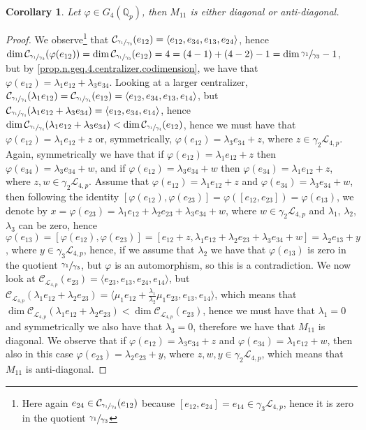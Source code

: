 \documentclass[12pt]{article}
\newtheorem{corollary}[theorem]{Corollary}
\begin{document}
\begin{corollary}
Let $\varphi\in G_4(\mathbb{Q}_p)$, then $M_{11}$ is either diagonal or anti-diagonal.
\end{corollary}
\begin{proof}
We observe\footnote{Here again $e_{24}\in\mathcal{C}_{\sfrac{\gamma_1}{\gamma_3}}(e_{12})$ because $[e_{12},e_{24}]=e_{14}\in\gamma_3\mathcal{L}_{4,p}$, hence it is zero in the quotient $\sfrac{\gamma_1}{\gamma_3}$} that $\mathcal{C}_{\sfrac{\gamma_1}{\gamma_3}}(e_{12})=\langle e_{12},e_{34},e_{13},e_{24}\rangle$, hence $\dim\mathcal{C}_{\sfrac{\gamma_1}{\gamma_3}}(\varphi(e_{12}))=\dim\mathcal{C}_{\sfrac{\gamma_1}{\gamma_3}}(e_{12})=4=(4-1)+(4-2)-1=\dim\sfrac{\gamma_1}{\gamma_3}-1$, but by \ref{prop.n.geq.4.centralizer.codimension}, we have that $\varphi(e_{12})=\lambda_1 e_{12}+\lambda_3 e_{34}$. Looking at a larger centralizer, $\mathcal{C}_{\sfrac{\gamma_1}{\gamma_4}}(\lambda_1 e_{12})=\mathcal{C}_{\sfrac{\gamma_1}{\gamma_4}}(e_{12})=\langle e_{12},e_{34},e_{13},e_{14}\rangle$, but $\mathcal{C}_{\sfrac{\gamma_1}{\gamma_4}}(\lambda_1 e_{12}+\lambda_3 e_{34})=\langle e_{12},e_{34},e_{14}\rangle$, hence $\dim\mathcal{C}_{\sfrac{\gamma_1}{\gamma_4}}(\lambda_1 e_{12}+\lambda_3 e_{34})<\dim\mathcal{C}_{\sfrac{\gamma_1}{\gamma_4}}(e_{12})$, hence we must have that $\varphi(e_{12})=\lambda_1 e_{12}+z$ or, symmetrically, $\varphi(e_{12})=\lambda_3 e_{34}+z$, where $z\in\gamma_2\mathcal{L}_{4,p}$. Again, symmetrically we have that if $\varphi(e_{12})=\lambda_1 e_{12}+z$ then $\varphi(e_{34})=\lambda_3 e_{34}+w$, and if $\varphi(e_{12})=\lambda_3 e_{34}+w$ then $\varphi(e_{34})=\lambda_1 e_{12}+z$, where $z,w\in\gamma_2\mathcal{L}_{4,p}$. Assume that $\varphi(e_{12})=\lambda_1 e_{12}+z$ and $\varphi(e_{34})=\lambda_3 e_{34}+w$, then following the identity $[\varphi(e_{12}),\varphi(e_{23})]=\varphi([e_{12},e_{23}])=\varphi(e_{13})$, we denote by $x=\varphi(e_{23})=\lambda_1 e_{12}+\lambda_2 e_{23}+\lambda_3 e_{34}+w$, where $w\in\gamma_2\mathcal{L}_{4,p}$ and $\lambda_1$, $\lambda_2$, $\lambda_3$ can be zero, hence $\varphi(e_{13})=[\varphi(e_{12}),\varphi(e_{23})]=[e_{12}+z,\lambda_1 e_{12}+\lambda_2 e_{23}+\lambda_3 e_{34}+w]=\lambda_2 e_{13}+y$, where $y\in\gamma_3\mathcal{L}_{4,p}$, hence, if we assume that $\lambda_2$ we have that $\varphi(e_{13})$ is zero in the quotient $\sfrac{\gamma_1}{\gamma_3}$, but $\varphi$ is an automorphism, so this is a contradiction. We now look at $\mathcal{C}_{\mathcal{L}_{4,p}}(e_{23})=\langle e_{23},e_{13},e_{24},e_{14}\rangle$, but $\mathcal{C}_{\mathcal{L}_{4,p}}(\lambda_1 e_{12}+\lambda_2 e_{23})=\langle \mu_1 e_{12}+\frac{\lambda_1}{\lambda_2}\mu_1 e_{23},e_{13},e_{14}\rangle$, which means that $\dim\mathcal{C}_{\mathcal{L}_{4,p}}(\lambda_1 e_{12}+\lambda_2 e_{23})<\dim\mathcal{C}_{\mathcal{L}_{4,p}}(e_{23})$, hence we must have that $\lambda_1=0$ and symmetrically we also have that $\lambda_3=0$, therefore we have that $M_{11}$ is diagonal. We observe that if $\varphi(e_{12})=\lambda_3 e_{34}+z$ and $\varphi(e_{34})=\lambda_1 e_{12}+w$, then also in this case $\varphi(e_{23})=\lambda_2 e_{23}+y$, where $z,w,y\in\gamma_2\mathcal{L}_{4,p}$, which means that $M_{11}$ is anti-diagonal.
\end{proof}
\end{document}
